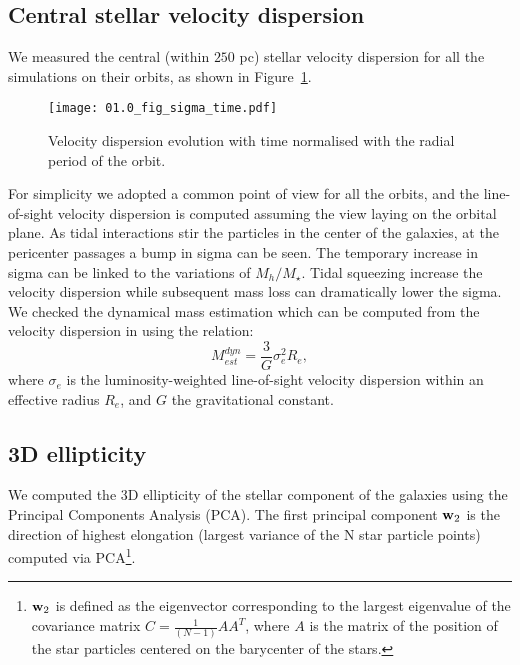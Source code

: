 \subsection{Central stellar velocity dispersion}
We measured the central (within $250$ pc) stellar velocity dispersion for all the simulations on their orbits, as shown in Figure~\ref{fig:sigma}.
\begin{figure}[h]
\centering
\texttt{[image: 01.0\_fig\_sigma\_time.pdf]}
\caption{Velocity dispersion evolution with time normalised with the radial period of the orbit.
}
\label{fig:sigma}
\end{figure}
For simplicity we adopted a common point of view for all the orbits, and the line-of-sight velocity dispersion is computed assuming the view laying on the orbital plane.
As tidal interactions stir the particles in the center of the galaxies, at the pericenter passages a bump in sigma can be seen.
The temporary increase in sigma can be linked to the variations of $M_h/M_\star$.
Tidal squeezing increase the velocity dispersion while subsequent mass loss can dramatically lower the sigma.
We checked the dynamical mass estimation which can be computed from the velocity dispersion in using the \citet{Wolf2010} relation:
\begin{equation*}
M^{dyn}_{est} = \dfrac{3}{G} \sigma_e^2 R_e, 
\end{equation*}
where $\sigma_e$ is the luminosity-weighted line-of-sight velocity dispersion within an effective radius $R_e$,
and $G$ the gravitational constant.





\subsection{3D ellipticity}
We computed the 3D ellipticity of the stellar component of the galaxies using the Principal Components Analysis (PCA).
The first principal component $\boldsymbol{\mathbf{w}}_2$ is the direction of highest elongation (largest variance of the N star particle points) computed via PCA\footnote{$\boldsymbol{\mathbf{w}}_2$ is defined as the eigenvector corresponding to the largest eigenvalue of the covariance matrix $C = \frac 1 {(N-1)} AA^T$, where $A$ is the matrix of the position of the star particles centered on the barycenter of the stars.}.

